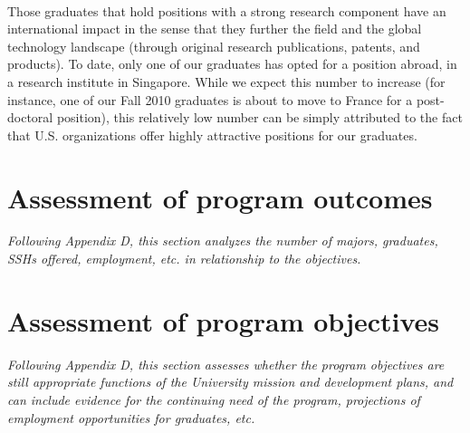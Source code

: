 \documentclass[12pt]{article}
\begin{document}
~\\
 Those graduates
that hold positions with a strong research component have an
international impact in the sense that they further the field and the
global technology landscape (through original research publications,
patents, and products). To date, only one of our
graduates has opted for a position abroad, in a research institute in
Singapore. While we expect this number to increase (for instance, one
of our Fall 2010 graduates is about to move to France for a
post-doctoral position), this relatively low number can be simply
attributed to the fact that U.S. organizations offer highly attractive
positions for our graduates.

\section{Assessment of program outcomes}

{\em Following Appendix D, this section analyzes the number of majors,
  graduates, SSHs offered, employment, etc. in relationship to the
  objectives.}




\section{Assessment of program objectives}

{\em Following Appendix D, this section assesses whether the program
  objectives are still appropriate functions of the University mission and
  development plans, and can include evidence for the continuing need of
  the program, projections of employment opportunities for graduates, etc.}
\end{document}
